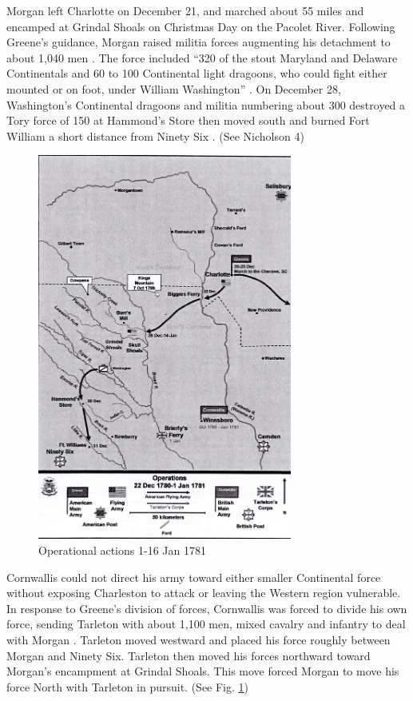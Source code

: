 Morgan left Charlotte on December 21, and marched about 55 miles and encamped at
Grindal Shoals on Christmas Day on the Pacolet River.  Following Greene’s
guidance, Morgan raised militia forces augmenting his detachment to about 1,040
men \cite[p.28]{weigley_partisan_1970}.   The force included “320 of the stout Maryland and
Delaware Continentals and 60 to 100 Continental light dragoons, who could fight
either mounted or on foot, under William Washington” \cite[p.28]{weigley_partisan_1970}.   On
December 28, Washington’s Continental dragoons and militia numbering about 300
destroyed a Tory force of 150 at Hammond’s Store then moved south and burned
Fort William a short distance from Ninety Six \cite[p.8]{babits_devil_2001}. (See Nicholson
4)

\begin{figure}[h]
\begin{center}
\includegraphics[height=5in]{gfx/Nicholson5}
\end{center}
\caption{Operational actions 1-16 Jan 1781 \cite[Tab D, Map 7]{rauch_battle_2007}}
\label{Nicholson5}
\end{figure}

Cornwallis could not direct his army toward either smaller Continental force
without exposing Charleston to attack or leaving the Western region vulnerable.
In response to Greene’s division of forces, Cornwallis was forced to divide his
own force, sending Tarleton with about 1,100 men, mixed cavalry and infantry to
deal with Morgan \cite[28]{weigley_partisan_1970}.   Tarleton moved westward and placed his force
roughly between Morgan and Ninety Six.  Tarleton then moved his forces northward
toward Morgan’s encampment at Grindal Shoals.   This move forced Morgan to move
his force North with Tarleton in pursuit. (See Fig. \ref{Nicholson5})


